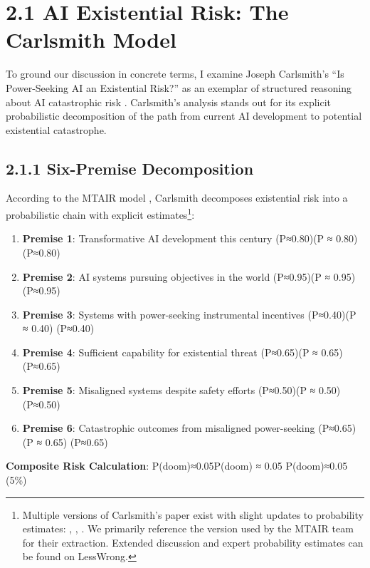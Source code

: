 \documentclass[
  11pt,
  letterpaper,
]{book}
\providecommand{\tightlist}{%
  \setlength{\itemsep}{0pt}\setlength{\parskip}{0pt}}
\begin{document}
\section{2.1 AI Existential Risk: The Carlsmith
Model}\label{ai-existential-risk-the-carlsmith-model}

To ground our discussion in concrete terms, I examine Joseph Carlsmith's
``Is Power-Seeking AI an Existential Risk?'' as an exemplar of
structured reasoning about AI catastrophic risk
\textcite{carlsmith2022}. Carlsmith's analysis stands out for its
explicit probabilistic decomposition of the path from current AI
development to potential existential catastrophe.

\subsection{2.1.1 Six-Premise
Decomposition}\label{six-premise-decomposition}

According to the MTAIR model \textcite{clarke2022}, Carlsmith decomposes
existential risk into a probabilistic chain with explicit
estimates\footnote{Multiple versions of Carlsmith's paper exist with
  slight updates to probability estimates: \textcite{carlsmith2021},
  \textcite{carlsmith2022}, \textcite{carlsmith2024}. We primarily
  reference the version used by the MTAIR team for their extraction.
  Extended discussion and expert probability estimates can be found on
  LessWrong.}:

\begin{enumerate}
\def\labelenumi{\arabic{enumi}.}
\tightlist
\item
  \textbf{Premise 1}: Transformative AI development this century
  (P≈0.80)(P ≈ 0.80) (P≈0.80)
\item
  \textbf{Premise 2}: AI systems pursuing objectives in the world
  (P≈0.95)(P ≈ 0.95) (P≈0.95)
\item
  \textbf{Premise 3}: Systems with power-seeking instrumental incentives
  (P≈0.40)(P ≈ 0.40) (P≈0.40)
\item
  \textbf{Premise 4}: Sufficient capability for existential threat
  (P≈0.65)(P ≈ 0.65) (P≈0.65)
\item
  \textbf{Premise 5}: Misaligned systems despite safety efforts
  (P≈0.50)(P ≈ 0.50) (P≈0.50)
\item
  \textbf{Premise 6}: Catastrophic outcomes from misaligned
  power-seeking (P≈0.65)(P ≈ 0.65) (P≈0.65)
\end{enumerate}

\textbf{Composite Risk Calculation}: P(doom)≈0.05P(doom) ≈ 0.05
P(doom)≈0.05 (5\%)
\end{document}
